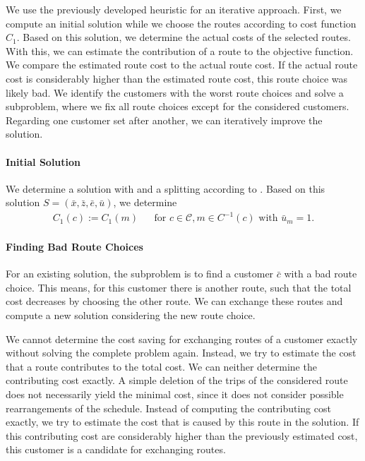 We use the previously developed heuristic for an iterative approach. First, we compute an initial solution while we choose the routes according to cost function $C_1$. Based on this solution, we determine the actual costs of the selected routes. With this, we can estimate the contribution of a route to the objective function. We compare the estimated route cost to the actual route cost. If the actual route cost is considerably higher than the estimated route cost, this route choice was likely bad. We identify the customers with the worst route choices and solve a subproblem, where we fix all route choices except for the considered customers. Regarding one customer set after another, we can iteratively improve the solution.

\paragraph{Initial Solution} \parfill

We determine a solution with  and a splitting according to . Based on this solution $S=\left(\bar{x},\bar{z},\bar{e},\bar{u}\right)$, we determine 
\begin{align*}
	C_1(c) := C_1(m) && \text{for } c\in\mathcal{C}, m\in C^{-1}(c) \text{ with } \bar{u}_m = 1.
\end{align*}

\paragraph{Finding Bad Route Choices} \parfill

For an existing solution, the subproblem is to find a customer $\bar{c}$ with a bad route choice. This means, for this customer there is another route, such that the total cost decreases by choosing the other route. We can exchange these routes and compute a new solution considering the new route choice. 

We cannot determine the cost saving for exchanging routes of a customer exactly without solving the complete problem again. Instead, we try to estimate the cost that a route contributes to the total cost. We can neither determine the contributing cost exactly. A simple deletion of the trips of the considered route does not necessarily yield the minimal cost, since it does not consider possible rearrangements of the schedule. Instead of computing the contributing cost exactly, we try to estimate the cost that is caused by this route in the solution. If this contributing cost are considerably higher than the previously estimated cost, this customer is a candidate for exchanging routes.


